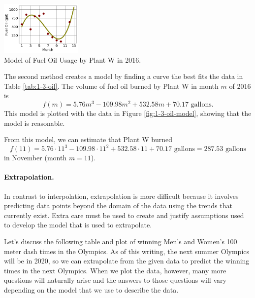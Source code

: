 \begin{example}
\begin{floatingfigure}{0.3\textwidth}
    \centering
    \includegraphics[width=0.3\textwidth]{img/chap1/sec1-3/fig1-3-oil-curve.png}\\
    \caption{Model of Fuel Oil Usage by Plant W in 2016.}
    \label{fig:1-3-oil-model}
\end{floatingfigure}
The second method creates a model by finding a curve the best fits the data in Table \ref{tab:1-3-oil}. The volume of fuel oil burned by Plant W in month $m$ of 2016 is
$$f(m) = 5.76m^3 - 109.98m^2 + 532.58m + 70.17\mbox{ gallons.}$$
This model is plotted with the data in Figure \ref{fig:1-3-oil-model}, showing that the model is reasonable.

From this model, we can estimate that Plant W burned
$$f(11) = 5.76\cdot 11^3 - 109.98\cdot 11^2 + 532.58\cdot 11 + 70.17\mbox{ gallons} = 287.53 \mbox{ gallons}$$
in November (month $m=11$).
\end{example}

\paragraph{Extrapolation.} In contrast to interpolation, extrapolation is more difficult because it involves predicting data points beyond the domain of the data using the trends that currently exist. Extra care must be used to create and justify assumptions used to develop the model that is used to extrapolate.

Let's discuss the following table and plot of winning Men's and Women's 100 meter dash times in the Olympics. As of this writing, the next summer Olympics will be in 2020, so we can extrapolate from the given data to predict the winning times in the next Olympics. When we plot the data, however, many more questions will naturally arise and the answers to those questions will vary depending on the model that we use to describe the data.

